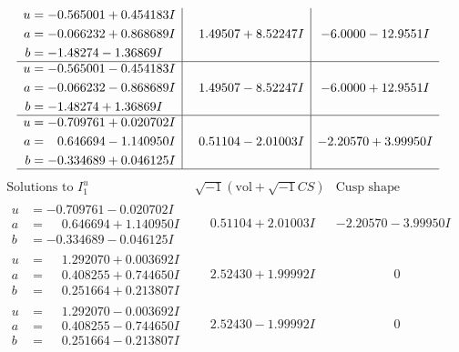 \documentclass[1p]{elsarticle_modified}
\theoremstyle{definition}
\newcommand{\I}{\sqrt{-1}}
\begin{document}
$$\begin{array}{c|c|c}
\begin{aligned}
u &= -0.565001 + 0.454183 I \\
a &= -0.066232 + 0.868689 I \\
b &= -1.48274 - 1.36869 I\end{aligned}
 & \phantom{-}1.49507 + 8.52247 I & -6.0000 - 12.9551 I \\ \hline\begin{aligned}
u &= -0.565001 - 0.454183 I \\
a &= -0.066232 - 0.868689 I \\
b &= -1.48274 + 1.36869 I\end{aligned}
 & \phantom{-}1.49507 - 8.52247 I & -6.0000 + 12.9551 I \\ \hline\begin{aligned}
u &= -0.709761 + 0.020702 I \\
a &= \phantom{-}0.646694 - 1.140950 I \\
b &= -0.334689 + 0.046125 I\end{aligned}
 & \phantom{-}0.51104 - 2.01003 I & -2.20570 + 3.99950 I\\
 \hline 
 \end{array}$$\newpage$$\begin{array}{c|c|c}  
\text{Solutions to }I^u_{1}& \I (\text{vol} + \sqrt{-1}CS) & \text{Cusp shape}\\
 \hline 
\begin{aligned}
u &= -0.709761 - 0.020702 I \\
a &= \phantom{-}0.646694 + 1.140950 I \\
b &= -0.334689 - 0.046125 I\end{aligned}
 & \phantom{-}0.51104 + 2.01003 I & -2.20570 - 3.99950 I \\ \hline\begin{aligned}
u &= \phantom{-}1.292070 + 0.003692 I \\
a &= \phantom{-}0.408255 + 0.744650 I \\
b &= \phantom{-}0.251664 + 0.213807 I\end{aligned}
 & \phantom{-}2.52430 + 1.99992 I & \phantom{-0.000000 } 0 \\ \hline\begin{aligned}
u &= \phantom{-}1.292070 - 0.003692 I \\
a &= \phantom{-}0.408255 - 0.744650 I \\
b &= \phantom{-}0.251664 - 0.213807 I\end{aligned}
 & \phantom{-}2.52430 - 1.99992 I & \phantom{-0.000000 } 0 \\ \hline\begin{aligned}

\end{aligned}
\end{array}$$
\end{document}
